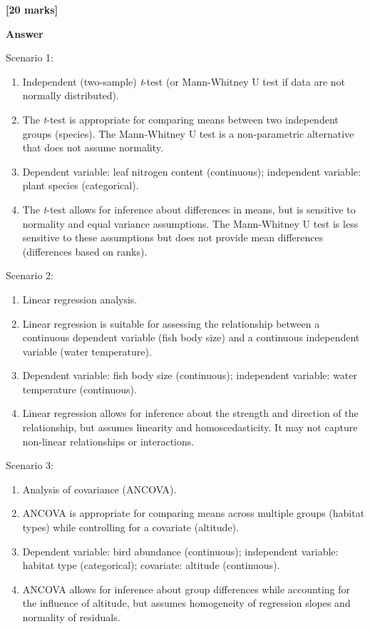 \documentclass[
  10t,
]{article}
\providecommand{\tightlist}{%
  \setlength{\itemsep}{0pt}\setlength{\parskip}{0pt}}
\begin{document}
\textbf{{[}20 marks{]}}

\textbf{Answer}

Scenario 1:

\begin{enumerate}
\def\labelenumi{\alph{enumi}.}
\tightlist
\item
  Independent (two-sample) \emph{t}-test (or Mann-Whitney U test if data
  are not normally distributed).
\item
  The \emph{t}-test is appropriate for comparing means between two
  independent groups (species). The Mann-Whitney U test is a
  non-parametric alternative that does not assume normality.
\item
  Dependent variable: leaf nitrogen content (continuous); independent
  variable: plant species (categorical).
\item
  The \emph{t}-test allows for inference about differences in means, but
  is sensitive to normality and equal variance assumptions. The
  Mann-Whitney U test is less sensitive to these assumptions but does
  not provide mean differences (differences based on ranks).
\end{enumerate}

Scenario 2:

\begin{enumerate}
\def\labelenumi{\alph{enumi}.}
\tightlist
\item
  Linear regression analysis.
\item
  Linear regression is suitable for assessing the relationship between a
  continuous dependent variable (fish body size) and a continuous
  independent variable (water temperature).
\item
  Dependent variable: fish body size (continuous); independent variable:
  water temperature (continuous).
\item
  Linear regression allows for inference about the strength and
  direction of the relationship, but assumes linearity and
  homoscedasticity. It may not capture non-linear relationships or
  interactions.
\end{enumerate}

Scenario 3:

\begin{enumerate}
\def\labelenumi{\alph{enumi}.}
\tightlist
\item
  Analysis of covariance (ANCOVA).
\item
  ANCOVA is appropriate for comparing means across multiple groups
  (habitat types) while controlling for a covariate (altitude).
\item
  Dependent variable: bird abundance (continuous); independent variable:
  habitat type (categorical); covariate: altitude (continuous).
\item
  ANCOVA allows for inference about group differences while accounting
  for the influence of altitude, but assumes homogeneity of regression
  slopes and normality of residuals.
\end{enumerate}
\end{document}
